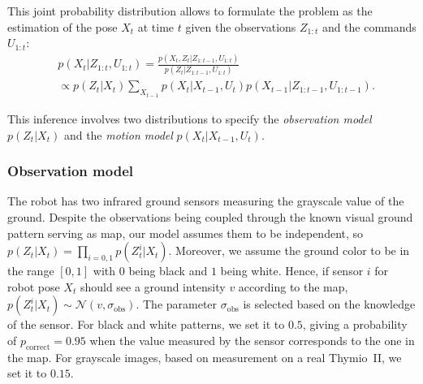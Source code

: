 \documentclass[letterpaper, 10pt, conference]{ieeeconf}
\begin{document}
This joint probability distribution allows to formulate the problem as the estimation of the pose $X_t$ at time $t$ given the observations $Z_{1:t}$ and the commands $U_{1:t}$:
\begin{equation*}
\begin{split}
& p(X_t|Z_{1:t},U_{1:t}) = \frac{p(X_t,Z_t | Z_{1:t-1}, U_{1:t})}{p(Z_t|Z_{1:t-1}, U_{1:t})} \\
 &\propto p(Z_t | X_t) \sum_{X_{t-1}} p(X_t|X_{t-1}, U_t) p(X_{t-1} | Z_{1:t-1}, U_{1:t-1}).
\end{split}
\end{equation*}

This inference involves two distributions to specify the \emph{observation model} $p(Z_t | X_t)$ and the \emph{motion model} $p(X_t|X_{t-1}, U_t)$.

\subsubsection{Observation model}

The robot has two infrared ground sensors measuring the grayscale value of the ground.
Despite the observations being coupled through the known visual ground pattern serving as map, our model assumes them to be independent, so $p(Z_t | X_t) = \prod_{i=0,1} p(Z_t^{i} | X_t)$.
Moreover, we assume the ground color to be in the range $[0,1]$ with $0$ being black and $1$ being white.
Hence, if sensor $i$ for robot pose $X_t$ should see a ground intensity $v$ according to the map, $p(Z_t^{i} | X_t) \sim \mathcal{N}(v,\sigma_\mathrm{obs})$.
The parameter $\sigma_\mathrm{obs}$ is selected based on the knowledge of the sensor.
For black and white patterns, we set it to $0.5$, giving a probability of $p_\mathrm{correct} = 0.95$ when the value measured by the sensor corresponds to the one in the map.
For grayscale images, based on measurement on a real Thymio~II, we set it to $0.15$.
\end{document}
